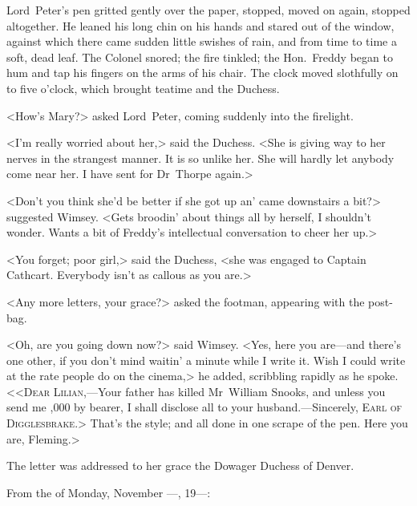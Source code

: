 Lord~Peter's pen gritted gently over the paper, stopped, moved on again, stopped altogether. He leaned his long chin on his hands and stared out of the window, against which there came sudden little swishes of rain, and from time to time a soft, dead leaf. The Colonel snored; the fire tinkled; the Hon.~Freddy began to hum and tap his fingers on the arms of his chair. The clock moved slothfully on to five o'clock, which brought teatime and the Duchess.

<How's Mary?> asked Lord~Peter, coming suddenly into the firelight.

<I'm really worried about her,> said the Duchess. <She is giving way to her nerves in the strangest manner. It is so unlike her. She will hardly let anybody come near her. I have sent for Dr~Thorpe again.>

<Don't you think she'd be better if she got up an' came downstairs a bit?> suggested Wimsey. <Gets broodin' about things all by herself, I shouldn't wonder. Wants a bit of Freddy's intellectual conversation to cheer her up.>

<You forget; poor girl,> said the Duchess, <she was engaged to Captain Cathcart. Everybody isn't as callous as you are.>

<Any more letters, your grace?> asked the footman, appearing with the post-bag.

<Oh, are you going down now?> said Wimsey. <Yes, here you are—and there's one other, if you don't mind waitin' a minute while I write it. Wish I could write at the rate people do on the cinema,> he added, scribbling rapidly as he spoke. <<\textsc{Dear Lilian},—Your father has killed Mr~William Snooks, and unless you send me ,000 by bearer, I shall disclose all to your husband.—Sincerely, \textsc{Earl of Digglesbrake}.> That's the style; and all done in one scrape of the pen. Here you are, Fleming.>

The letter was addressed to her grace the Dowager Duchess of Denver.


\divider

\begin{a4}
	\clearpage
\end{a4}

From the  of Monday, November —, 19—:

